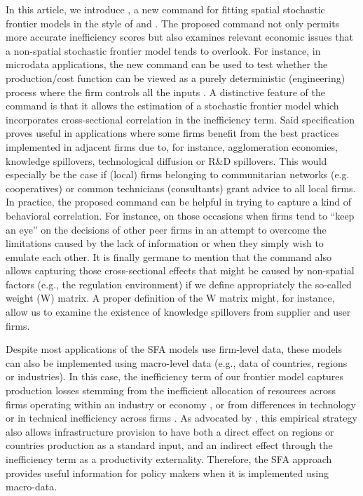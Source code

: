 In this article, we introduce , a new command for fitting spatial stochastic frontier models in the style of \cite{orea2019new} and \cite{galli2022spatial}. The proposed  command not only permits more accurate inefficiency scores \citep*[see e.g.,][]{orea2018spatial} but also examines relevant economic issues that a non-spatial stochastic frontier model tends to overlook. For instance, in microdata applications, the new command can be used to test whether the production/cost function can be viewed as a purely deterministic (engineering) process where the firm controls all the inputs \citep[see e.g.,][]{druska2004generalized}. A distinctive feature of the  command is that it allows the estimation of a stochastic frontier model which incorporates cross-sectional correlation in the inefficiency term. Said specification proves useful in applications where some firms benefit from the best practices implemented in adjacent firms due to, for instance, agglomeration economies, knowledge spillovers, technological diffusion or R\&D spillovers. This would especially be the case if (local) firms belonging to communitarian networks (e.g. cooperatives) or common technicians (consultants) grant advice to all local firms. In practice, the proposed  command can be helpful in trying to capture a kind of behavioral correlation. For instance, on those occasions when firms tend to “keep an eye” on the decisions of other peer firms in an attempt to overcome the limitations caused by the lack of information or when they simply wish to emulate each other. It is finally germane to mention that the  command also allows capturing those cross-sectional effects that might be caused by non-spatial factors (e.g., the regulation environment) if we define appropriately the so-called weight (W) matrix. A proper definition of the W matrix might, for instance, allow us to examine the existence of knowledge spillovers from supplier and user firms. 

Despite most applications of the SFA models use firm-level data, these models can also be implemented using macro-level data (e.g., data of countries, regions or industries). In this case, the inefficiency term of our frontier model captures production losses stemming from the inefficient allocation of resources across firms operating within an industry or economy \citep{restuccia2013misallocation}, or from differences in technology or in technical inefficiency across firms \citep*{orea2023industry}. As advocated by \cite{straub2011infrastructure}, this empirical strategy also allows infrastructure provision to have both a direct effect on regions or countries production as a standard input, and an indirect effect through the inefficiency term as a productivity externality. Therefore, the SFA approach provides useful information for policy makers when it is implemented using macro-data.

